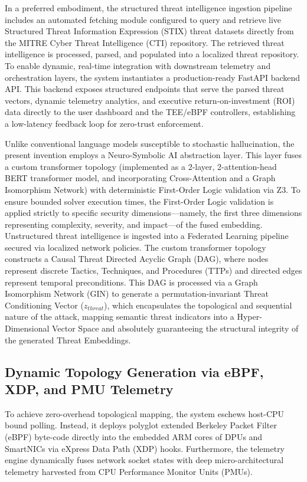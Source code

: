 \documentclass[12pt, letterpaper]{article}
\begin{document}
In a preferred embodiment, the structured threat intelligence ingestion pipeline includes an automated fetching module configured to query and retrieve live Structured Threat Information Expression (STIX) threat datasets directly from the MITRE Cyber Threat Intelligence (CTI) repository. The retrieved threat intelligence is processed, parsed, and populated into a localized threat repository. To enable dynamic, real-time integration with downstream telemetry and orchestration layers, the system instantiates a production-ready FastAPI backend API. This backend exposes structured endpoints that serve the parsed threat vectors, dynamic telemetry analytics, and executive return-on-investment (ROI) data directly to the user dashboard and the TEE/eBPF controllers, establishing a low-latency feedback loop for zero-trust enforcement.

Unlike conventional language models susceptible to stochastic hallucination, the present invention employs a Neuro-Symbolic AI abstraction layer. This layer fuses a custom transformer topology (implemented as a 2-layer, 2-attention-head BERT transformer model, and incorporating Cross-Attention and a Graph Isomorphism Network) with deterministic First-Order Logic validation via Z3. To ensure bounded solver execution times, the First-Order Logic validation is applied strictly to specific security dimensions—namely, the first three dimensions representing complexity, severity, and impact—of the fused embedding. Unstructured threat intelligence is ingested into a Federated Learning pipeline secured via localized network policies. The custom transformer topology constructs a Causal Threat Directed Acyclic Graph (DAG), where nodes represent discrete Tactics, Techniques, and Procedures (TTPs) and directed edges represent temporal preconditions. This DAG is processed via a Graph Isomorphism Network (GIN) to generate a permutation-invariant Threat Conditioning Vector ($z_{\mathit{threat}}$), which encapsulates the topological and sequential nature of the attack, mapping semantic threat indicators into a Hyper-Dimensional Vector Space and absolutely guaranteeing the structural integrity of the generated Threat Embeddings.

\subsection{Dynamic Topology Generation via eBPF, XDP, and PMU Telemetry}
To achieve zero-overhead topological mapping, the system eschews host-CPU bound polling. Instead, it deploys polyglot extended Berkeley Packet Filter (eBPF) byte-code directly into the embedded ARM cores of DPUs and SmartNICs via eXpress Data Path (XDP) hooks. Furthermore, the telemetry engine dynamically fuses network socket states with deep micro-architectural telemetry harvested from CPU Performance Monitor Units (PMUs). 
\end{document}
